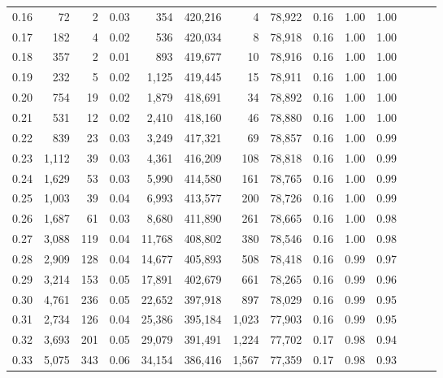 \begin{tabular}{rrrrrrrrrrrrrr}
0.16 &      72 &      2 &  0.03 &      354 &  420,216 &       4 &  78,922 &  0.16 &  1.00 &      1.00 \\
0.17 &     182 &      4 &  0.02 &      536 &  420,034 &       8 &  78,918 &  0.16 &  1.00 &      1.00 \\
0.18 &     357 &      2 &  0.01 &      893 &  419,677 &      10 &  78,916 &  0.16 &  1.00 &      1.00 \\
0.19 &     232 &      5 &  0.02 &    1,125 &  419,445 &      15 &  78,911 &  0.16 &  1.00 &      1.00 \\
0.20 &     754 &     19 &  0.02 &    1,879 &  418,691 &      34 &  78,892 &  0.16 &  1.00 &      1.00 \\
0.21 &     531 &     12 &  0.02 &    2,410 &  418,160 &      46 &  78,880 &  0.16 &  1.00 &      1.00 \\
0.22 &     839 &     23 &  0.03 &    3,249 &  417,321 &      69 &  78,857 &  0.16 &  1.00 &      0.99 \\
0.23 &   1,112 &     39 &  0.03 &    4,361 &  416,209 &     108 &  78,818 &  0.16 &  1.00 &      0.99 \\
0.24 &   1,629 &     53 &  0.03 &    5,990 &  414,580 &     161 &  78,765 &  0.16 &  1.00 &      0.99 \\
0.25 &   1,003 &     39 &  0.04 &    6,993 &  413,577 &     200 &  78,726 &  0.16 &  1.00 &      0.99 \\
0.26 &   1,687 &     61 &  0.03 &    8,680 &  411,890 &     261 &  78,665 &  0.16 &  1.00 &      0.98 \\
0.27 &   3,088 &    119 &  0.04 &   11,768 &  408,802 &     380 &  78,546 &  0.16 &  1.00 &      0.98 \\
0.28 &   2,909 &    128 &  0.04 &   14,677 &  405,893 &     508 &  78,418 &  0.16 &  0.99 &      0.97 \\
0.29 &   3,214 &    153 &  0.05 &   17,891 &  402,679 &     661 &  78,265 &  0.16 &  0.99 &      0.96 \\
0.30 &   4,761 &    236 &  0.05 &   22,652 &  397,918 &     897 &  78,029 &  0.16 &  0.99 &      0.95 \\
0.31 &   2,734 &    126 &  0.04 &   25,386 &  395,184 &   1,023 &  77,903 &  0.16 &  0.99 &      0.95 \\
0.32 &   3,693 &    201 &  0.05 &   29,079 &  391,491 &   1,224 &  77,702 &  0.17 &  0.98 &      0.94 \\
0.33 &   5,075 &    343 &  0.06 &   34,154 &  386,416 &   1,567 &  77,359 &  0.17 &  0.98 &      0.93 \\

\end{tabular}
